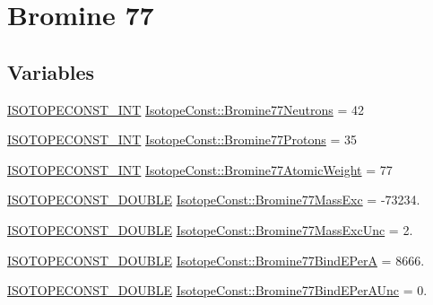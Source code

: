 \hypertarget{group___isotope_const-_bromine-_br77}{}\section{Bromine 77}
\label{group___isotope_const-_bromine-_br77}
\subsection*{Variables}
\begin{DoxyCompactItemize}
\item 
\mbox{\hyperlink{group___isotope_const-_macros_ga5f18360b3e99483a35c32d789e62621c}{I\+S\+O\+T\+O\+P\+E\+C\+O\+N\+S\+T\+\_\+\+I\+NT}} \mbox{\hyperlink{group___isotope_const-_bromine-_br77_ga518cb95c0a8993d4190f611cdaad8c1c}{Isotope\+Const\+::\+Bromine77\+Neutrons}} = 42
\item 
\mbox{\hyperlink{group___isotope_const-_macros_ga5f18360b3e99483a35c32d789e62621c}{I\+S\+O\+T\+O\+P\+E\+C\+O\+N\+S\+T\+\_\+\+I\+NT}} \mbox{\hyperlink{group___isotope_const-_bromine-_br77_ga1ea5fd1c2a7636d793f516823bf8c1a8}{Isotope\+Const\+::\+Bromine77\+Protons}} = 35
\item 
\mbox{\hyperlink{group___isotope_const-_macros_ga5f18360b3e99483a35c32d789e62621c}{I\+S\+O\+T\+O\+P\+E\+C\+O\+N\+S\+T\+\_\+\+I\+NT}} \mbox{\hyperlink{group___isotope_const-_bromine-_br77_gafa62ce50a4c58690e91182b1843ebca2}{Isotope\+Const\+::\+Bromine77\+Atomic\+Weight}} = 77
\item 
\mbox{\hyperlink{group___isotope_const-_macros_ga8f45a7272ce02c0b4c65c44636ed719a}{I\+S\+O\+T\+O\+P\+E\+C\+O\+N\+S\+T\+\_\+\+D\+O\+U\+B\+LE}} \mbox{\hyperlink{group___isotope_const-_bromine-_br77_gae643f78a0a12d6467d63543a947814b0}{Isotope\+Const\+::\+Bromine77\+Mass\+Exc}} = -\/73234.
\item 
\mbox{\hyperlink{group___isotope_const-_macros_ga8f45a7272ce02c0b4c65c44636ed719a}{I\+S\+O\+T\+O\+P\+E\+C\+O\+N\+S\+T\+\_\+\+D\+O\+U\+B\+LE}} \mbox{\hyperlink{group___isotope_const-_bromine-_br77_ga9d1d7049250cc7b57be7c67166a4db5c}{Isotope\+Const\+::\+Bromine77\+Mass\+Exc\+Unc}} = 2.
\item 
\mbox{\hyperlink{group___isotope_const-_macros_ga8f45a7272ce02c0b4c65c44636ed719a}{I\+S\+O\+T\+O\+P\+E\+C\+O\+N\+S\+T\+\_\+\+D\+O\+U\+B\+LE}} \mbox{\hyperlink{group___isotope_const-_bromine-_br77_ga28afea2d3668ea54b8e5c73d5d9574e5}{Isotope\+Const\+::\+Bromine77\+Bind\+E\+PerA}} = 8666.
\item 
\mbox{\hyperlink{group___isotope_const-_macros_ga8f45a7272ce02c0b4c65c44636ed719a}{I\+S\+O\+T\+O\+P\+E\+C\+O\+N\+S\+T\+\_\+\+D\+O\+U\+B\+LE}} \mbox{\hyperlink{group___isotope_const-_bromine-_br77_gaafa715e76ab80cc5b670dcbd7ed8d872}{Isotope\+Const\+::\+Bromine77\+Bind\+E\+Per\+A\+Unc}} = 0.

\end{DoxyCompactItemize}
